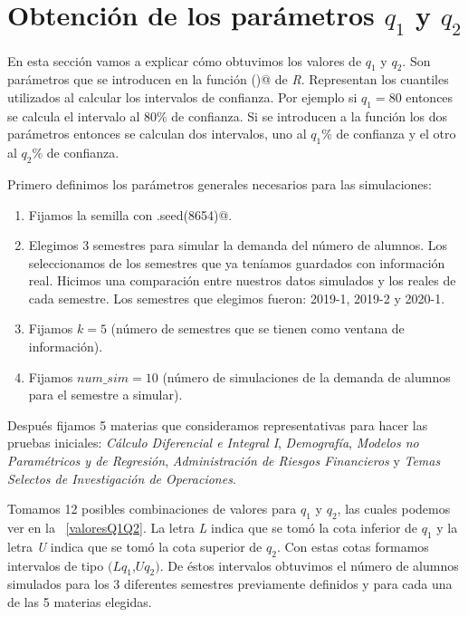 \section{Obtención de los parámetros $q_{1}$ y $q_{2}$}

En esta sección vamos a explicar cómo obtuvimos los valores de $q_{1}$ y $q_{2}$. Son parámetros que se introducen en la función \verb@hw()@ de \textit{R}. Representan los cuantiles utilizados al calcular los intervalos de confianza. Por ejemplo si $q_{1} = 80$ entonces se calcula el intervalo al $80\%$ de confianza. Si se introducen a la función los dos parámetros entonces se calculan dos intervalos, uno al $q_{1}\%$ de confianza y el otro al $q_{2}\%$ de confianza.

Primero definimos los parámetros generales necesarios para las simulaciones:
  
  \begin{enumerate}
\item Fijamos la semilla con \verb@set.seed(8654)@.

\item Elegimos 3 semestres para simular la demanda del número de alumnos. Los seleccionamos de los semestres que ya teníamos guardados con información real. Hicimos una comparación entre nuestros datos simulados y los reales de cada semestre. Los semestres que elegimos fueron: 2019-1, 2019-2 y 2020-1.

\item Fijamos $k = 5$ (número de semestres que se tienen como ventana de información).

\item Fijamos $num\_sim = 10$ (número de simulaciones de la demanda de alumnos para el semestre a simular).
\end{enumerate}


Después fijamos 5 materias que consideramos representativas para hacer las pruebas iniciales: \textit{Cálculo Diferencial e Integral I}, \textit{Demografía}, \textit{Modelos no Paramétricos y de Regresión}, \textit{Administración de Riesgos Financieros} y \textit{Temas Selectos de Investigación de Operaciones}.

Tomamos 12 posibles combinaciones de valores para $q_{1}$ y $q_{2}$, las cuales podemos ver en la \tablename{~\ref{valoresQ1Q2}}. La letra \textit{L} indica que se tomó la cota inferior de $q_{1}$ y la letra \textit{U} indica que se tomó la cota superior de $q_{2}$. Con estas cotas formamos intervalos de tipo $(Lq_{1}$,$Uq_{2})$. De éstos intervalos obtuvimos el número de alumnos simulados para los 3 diferentes semestres previamente definidos y para cada una de las 5 materias elegidas.

